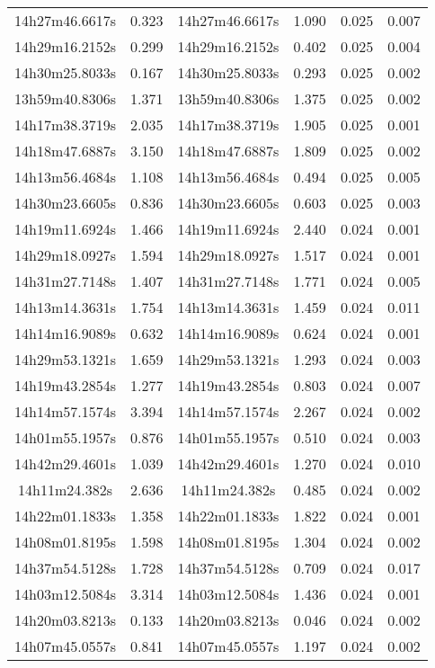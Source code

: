 \begin{table}
\begin{tabular}{cccccc}
14h27m46.6617s & 0.323 & 14h27m46.6617s & 1.090 & 0.025 & 0.007 \\
14h29m16.2152s & 0.299 & 14h29m16.2152s & 0.402 & 0.025 & 0.004 \\
14h30m25.8033s & 0.167 & 14h30m25.8033s & 0.293 & 0.025 & 0.002 \\
13h59m40.8306s & 1.371 & 13h59m40.8306s & 1.375 & 0.025 & 0.002 \\
14h17m38.3719s & 2.035 & 14h17m38.3719s & 1.905 & 0.025 & 0.001 \\
14h18m47.6887s & 3.150 & 14h18m47.6887s & 1.809 & 0.025 & 0.002 \\
14h13m56.4684s & 1.108 & 14h13m56.4684s & 0.494 & 0.025 & 0.005 \\
14h30m23.6605s & 0.836 & 14h30m23.6605s & 0.603 & 0.025 & 0.003 \\
14h19m11.6924s & 1.466 & 14h19m11.6924s & 2.440 & 0.024 & 0.001 \\
14h29m18.0927s & 1.594 & 14h29m18.0927s & 1.517 & 0.024 & 0.001 \\
14h31m27.7148s & 1.407 & 14h31m27.7148s & 1.771 & 0.024 & 0.005 \\
14h13m14.3631s & 1.754 & 14h13m14.3631s & 1.459 & 0.024 & 0.011 \\
14h14m16.9089s & 0.632 & 14h14m16.9089s & 0.624 & 0.024 & 0.001 \\
14h29m53.1321s & 1.659 & 14h29m53.1321s & 1.293 & 0.024 & 0.003 \\
14h19m43.2854s & 1.277 & 14h19m43.2854s & 0.803 & 0.024 & 0.007 \\
14h14m57.1574s & 3.394 & 14h14m57.1574s & 2.267 & 0.024 & 0.002 \\
14h01m55.1957s & 0.876 & 14h01m55.1957s & 0.510 & 0.024 & 0.003 \\
14h42m29.4601s & 1.039 & 14h42m29.4601s & 1.270 & 0.024 & 0.010 \\
14h11m24.382s & 2.636 & 14h11m24.382s & 0.485 & 0.024 & 0.002 \\
14h22m01.1833s & 1.358 & 14h22m01.1833s & 1.822 & 0.024 & 0.001 \\
14h08m01.8195s & 1.598 & 14h08m01.8195s & 1.304 & 0.024 & 0.002 \\
14h37m54.5128s & 1.728 & 14h37m54.5128s & 0.709 & 0.024 & 0.017 \\
14h03m12.5084s & 3.314 & 14h03m12.5084s & 1.436 & 0.024 & 0.001 \\
14h20m03.8213s & 0.133 & 14h20m03.8213s & 0.046 & 0.024 & 0.002 \\
14h07m45.0557s & 0.841 & 14h07m45.0557s & 1.197 & 0.024 & 0.002 \\

\end{tabular}
\end{table}
